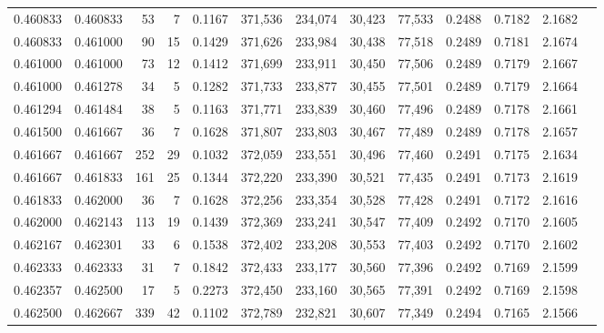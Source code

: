 \begin{tabular}{rrrrrrrrrrrrr}
0.460833 & 0.460833 &    53 &   7 &                                     0.1167 & 371,536 & 234,074 &  30,423 &  77,533 & 0.2488 & 0.7182 & 2.1682 \\
0.460833 & 0.461000 &    90 &  15 &                                     0.1429 & 371,626 & 233,984 &  30,438 &  77,518 & 0.2489 & 0.7181 & 2.1674 \\
0.461000 & 0.461000 &    73 &  12 &                                     0.1412 & 371,699 & 233,911 &  30,450 &  77,506 & 0.2489 & 0.7179 & 2.1667 \\
0.461000 & 0.461278 &    34 &   5 &                                     0.1282 & 371,733 & 233,877 &  30,455 &  77,501 & 0.2489 & 0.7179 & 2.1664 \\
0.461294 & 0.461484 &    38 &   5 &                                     0.1163 & 371,771 & 233,839 &  30,460 &  77,496 & 0.2489 & 0.7178 & 2.1661 \\
0.461500 & 0.461667 &    36 &   7 &                                     0.1628 & 371,807 & 233,803 &  30,467 &  77,489 & 0.2489 & 0.7178 & 2.1657 \\
0.461667 & 0.461667 &   252 &  29 &                                     0.1032 & 372,059 & 233,551 &  30,496 &  77,460 & 0.2491 & 0.7175 & 2.1634 \\
0.461667 & 0.461833 &   161 &  25 &                                     0.1344 & 372,220 & 233,390 &  30,521 &  77,435 & 0.2491 & 0.7173 & 2.1619 \\
0.461833 & 0.462000 &    36 &   7 &                                     0.1628 & 372,256 & 233,354 &  30,528 &  77,428 & 0.2491 & 0.7172 & 2.1616 \\
0.462000 & 0.462143 &   113 &  19 &                                     0.1439 & 372,369 & 233,241 &  30,547 &  77,409 & 0.2492 & 0.7170 & 2.1605 \\
0.462167 & 0.462301 &    33 &   6 &                                     0.1538 & 372,402 & 233,208 &  30,553 &  77,403 & 0.2492 & 0.7170 & 2.1602 \\
0.462333 & 0.462333 &    31 &   7 &                                     0.1842 & 372,433 & 233,177 &  30,560 &  77,396 & 0.2492 & 0.7169 & 2.1599 \\
0.462357 & 0.462500 &    17 &   5 &                                     0.2273 & 372,450 & 233,160 &  30,565 &  77,391 & 0.2492 & 0.7169 & 2.1598 \\
0.462500 & 0.462667 &   339 &  42 &                                     0.1102 & 372,789 & 232,821 &  30,607 &  77,349 & 0.2494 & 0.7165 & 2.1566 \\

\end{tabular}
